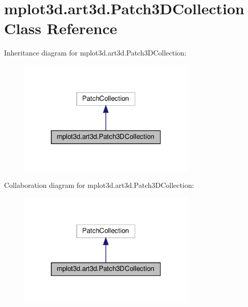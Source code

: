 \hypertarget{classmplot3d_1_1art3d_1_1Patch3DCollection}{}\section{mplot3d.\+art3d.\+Patch3\+D\+Collection Class Reference}
\label{classmplot3d_1_1art3d_1_1Patch3DCollection}


Inheritance diagram for mplot3d.\+art3d.\+Patch3\+D\+Collection\+:
\nopagebreak
\begin{figure}[H]
\begin{center}
\leavevmode
\includegraphics[width=241pt]{classmplot3d_1_1art3d_1_1Patch3DCollection__inherit__graph}
\end{center}
\end{figure}


Collaboration diagram for mplot3d.\+art3d.\+Patch3\+D\+Collection\+:
\nopagebreak
\begin{figure}[H]
\begin{center}
\leavevmode
\includegraphics[width=241pt]{classmplot3d_1_1art3d_1_1Patch3DCollection__coll__graph}
\end{center}
\end{figure}
